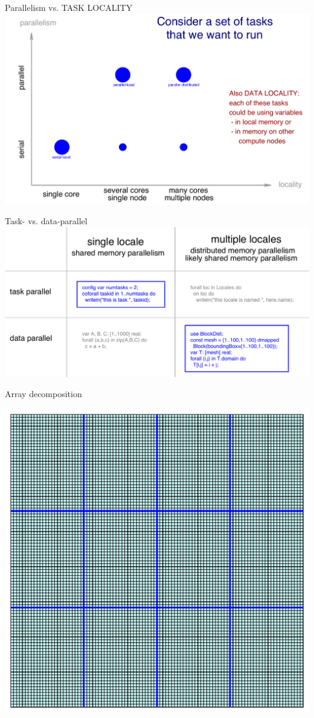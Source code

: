 \documentclass[10pt,xcolor=pdftex,dvipsnames,table]{beamer}
\begin{document}
\begin{frame}{Parallelism vs. TASK LOCALITY}
  \includegraphics[width=1.0\columnwidth]{orthogonal.pdf}
\end{frame}

\begin{frame}{Task- vs. data-parallel}
  \includegraphics[width=1.0\columnwidth]{parallel.pdf}
\end{frame}

\begin{frame}{Array decomposition}
  \begin{center}
    \includegraphics[width=0.68\columnwidth]{decomposition.pdf}
  \end{center}
\end{frame}
\end{document}
